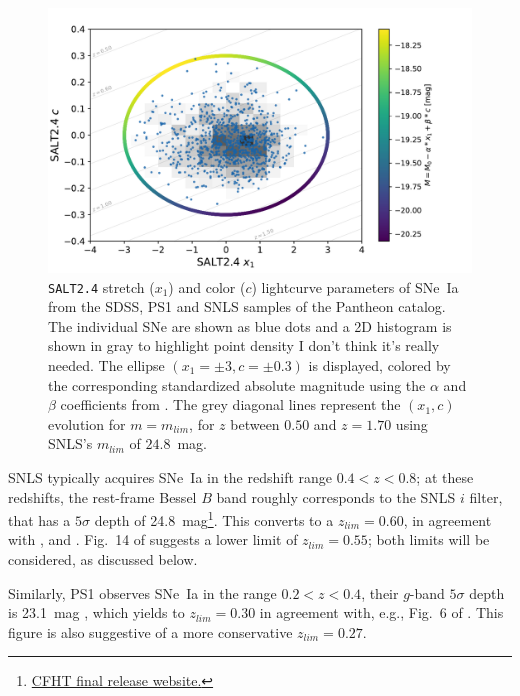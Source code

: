 \documentclass[]{aa} %
\newcommand{\yc}[1]{{\textcolor{BrickRed}{#1}}}
\begin{document}
\begin{figure}
    \centering
    \includegraphics[width=0.95\linewidth]{Article_figures/zmax_maglim_snls.pdf}
    \caption{\textsc{\texttt{SALT2.4}} stretch ($x_1$) and color ($c$)
        lightcurve parameters of SNe~Ia from the SDSS, PS1 and SNLS samples of
        the Pantheon catalog.  The individual SNe are shown as blue dots and a
        2D histogram is shown in gray to highlight point density \yc{I don't think it's really needed}. The ellipse
        $(x_1=\pm3, c=\pm0.3)$ is displayed, colored by the corresponding
        standardized absolute magnitude using the $\alpha$ and $\beta$
        coefficients from \cite{scolnic2018a}. The grey diagonal lines represent
    the $(x_1, c)$ evolution for $m = m_{lim}$, for $z$ between $0.50$ and
$z=1.70$ using SNLS's $m_{lim}$ of $24.8$~mag.}
    \label{fig:maglim}
\end{figure}

SNLS typically acquires SNe~Ia in the redshift range $0.4<z<0.8$; at these
redshifts, the rest-frame Bessel $B$ band roughly corresponds to the SNLS $i$
filter, that has a $5\sigma$ depth of
24.8~mag\footnote{\href{https://www.cfht.hawaii.edu/Science/CFHTLS/cfhtlsfinalreleaseexecsummary.html}{CFHT
final release website.}}. This converts to a $z_{lim}=0.60$, in agreement with
\cite{neill2006}, \cite{perrett2010} and \cite{bazin2011}.  Fig.~14 of
\cite{perrett2010} suggests a lower limit of $z_{lim}=0.55$; both \yc{limits} will be
considered, as discussed below.

Similarly, PS1 observes SNe~Ia in the range $0.2<z<0.4$, their $g$-band
$5\sigma$ depth is 23.1~mag \citep{rest2014}, which yields to $z_{lim}=0.30$ in
agreement with, e.g., Fig.~6 of \cite{scolnic2018a}. This figure \yc{is also suggestive of} a more conservative $z_{lim}=0.27$.
\end{document}
